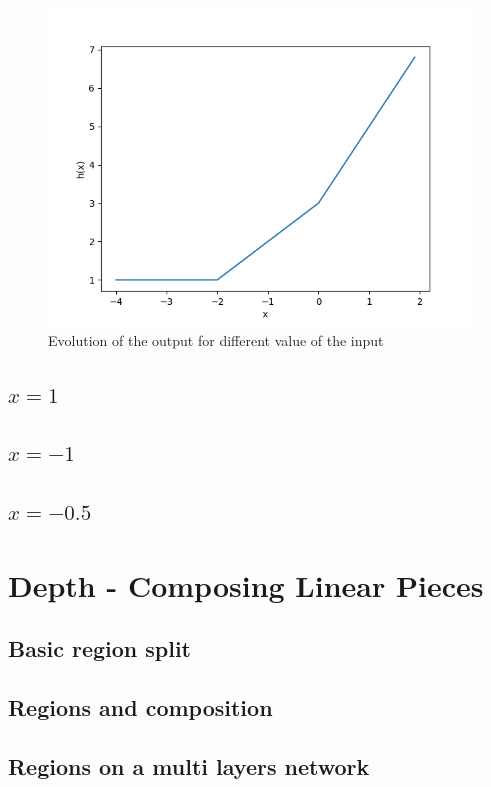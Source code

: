 \documentclass[11pt,english]{article}
\begin{document}
    \begin{figure}[h!]
        \begin{center}
            \includegraphics[width=0.5\linewidth]{../3_piecewise_linearity/curve.png}
            \caption{Evolution of the output for different value of the input}
        \end{center}
    \end{figure}

    \subsection{$x=1$}
    

    \pagebreak
    \subsection{$x=-1$}
    

    \pagebreak
    \subsection{$x=-0.5$}
    

    \pagebreak
    \section{Depth - Composing Linear Pieces}
    \subsection{Basic region split}
    

    \pagebreak
    \subsection{Regions and composition}
    

    \pagebreak
    \subsection{Regions on a multi layers network}
    
\end{document}
